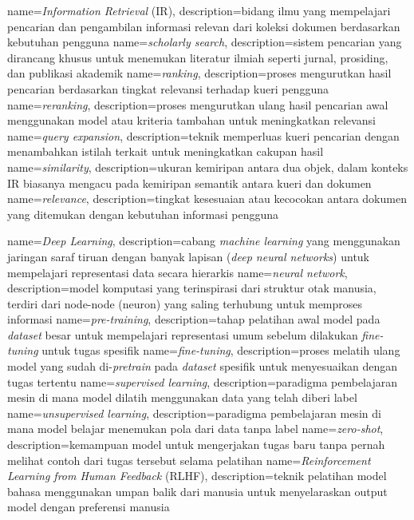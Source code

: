 {
	name={\textit{Information Retrieval} (IR)},
	description={bidang ilmu yang mempelajari pencarian dan pengambilan informasi relevan dari koleksi dokumen berdasarkan kebutuhan pengguna}
}
{
	name={\textit{scholarly search}},
	description={sistem pencarian yang dirancang khusus untuk menemukan literatur ilmiah seperti jurnal, prosiding, dan publikasi akademik}
}
{
	name={\textit{ranking}},
	description={proses mengurutkan hasil pencarian berdasarkan tingkat relevansi terhadap kueri pengguna}
}
{
	name={\textit{reranking}},
	description={proses mengurutkan ulang hasil pencarian awal menggunakan model atau kriteria tambahan untuk meningkatkan relevansi}
}
{
	name={\textit{query expansion}},
	description={teknik memperluas kueri pencarian dengan menambahkan istilah terkait untuk meningkatkan cakupan hasil}
}
{
	name={\textit{similarity}},
	description={ukuran kemiripan antara dua objek, dalam konteks IR biasanya mengacu pada kemiripan semantik antara kueri dan dokumen}
}
{
	name={\textit{relevance}},
	description={tingkat kesesuaian atau kecocokan antara dokumen yang ditemukan dengan kebutuhan informasi pengguna}
}

{
	name={\textit{Deep Learning}},
	description={cabang \textit{machine learning} yang menggunakan jaringan saraf tiruan dengan banyak lapisan (\textit{deep neural networks}) untuk mempelajari representasi data secara hierarkis}
}
{
	name={\textit{neural network}},
	description={model komputasi yang terinspirasi dari struktur otak manusia, terdiri dari node-node (neuron) yang saling terhubung untuk memproses informasi}
}
{
	name={\textit{pre-training}},
	description={tahap pelatihan awal model pada \textit{dataset} besar untuk mempelajari representasi umum sebelum dilakukan \textit{fine-tuning} untuk tugas spesifik}
}
{
	name={\textit{fine-tuning}},
	description={proses melatih ulang model yang sudah di-\textit{pretrain} pada \textit{dataset} spesifik untuk menyesuaikan dengan tugas tertentu}
}
{
	name={\textit{supervised learning}},
	description={paradigma pembelajaran mesin di mana model dilatih menggunakan data yang telah diberi label}
}
{
	name={\textit{unsupervised learning}},
	description={paradigma pembelajaran mesin di mana model belajar menemukan pola dari data tanpa label}
}
{
	name={\textit{zero-shot}},
	description={kemampuan model untuk mengerjakan tugas baru tanpa pernah melihat contoh dari tugas tersebut selama pelatihan}
}
{
	name={\textit{Reinforcement Learning from Human Feedback} (RLHF)},
	description={teknik pelatihan model bahasa menggunakan umpan balik dari manusia untuk menyelaraskan output model dengan preferensi manusia}
}

